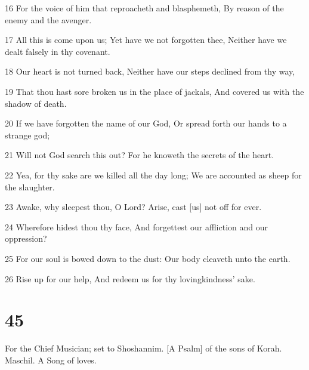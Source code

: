 \par 16 For the voice of him that reproacheth and blasphemeth, By reason of the enemy and the avenger.
\par 17 All this is come upon us; Yet have we not forgotten thee, Neither have we dealt falsely in thy covenant.
\par 18 Our heart is not turned back, Neither have our steps declined from thy way,
\par 19 That thou hast sore broken us in the place of jackals, And covered us with the shadow of death.
\par 20 If we have forgotten the name of our God, Or spread forth our hands to a strange god;
\par 21 Will not God search this out? For he knoweth the secrets of the heart.
\par 22 Yea, for thy sake are we killed all the day long; We are accounted as sheep for the slaughter.
\par 23 Awake, why sleepest thou, O Lord? Arise, cast [us] not off for ever.
\par 24 Wherefore hidest thou thy face, And forgettest our affliction and our oppression?
\par 25 For our soul is bowed down to the dust: Our body cleaveth unto the earth.
\par 26 Rise up for our help, And redeem us for thy lovingkindness' sake.

\chapter{45}

\par For the Chief Musician; set to Shoshannim. [A Psalm] of the sons of Korah. Maschil. A Song of loves.

